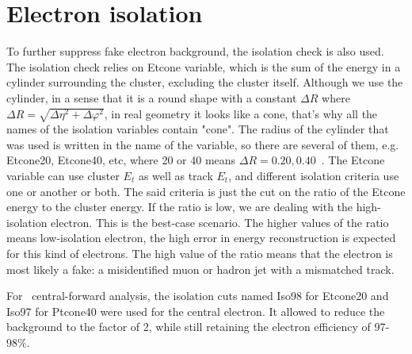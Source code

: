 \section{Electron isolation}
\label{sec:Rec_eleciso}

To further suppress fake electron background, the isolation check is also used. The isolation check relies on Etcone variable, which is the sum of the energy in a cylinder surrounding the cluster, excluding the cluster itself. Although we use the cylinder, in a sense that it is a round shape with a constant $\Delta R$ where $\Delta R = \sqrt{\Delta\eta^{2} + \Delta\varphi^{2}}$, in real geometry it looks like a cone, that's why all the names of the isolation variables contain "cone".  The radius of the cylinder that was used is written in the name of the variable, so there are several of them, e.g. Etcone20, Etcone40, etc, where 20 or 40 means $\Delta R = 0.20 , 0.40$~\cite{lib:reco_iso}. The Etcone variable can use cluster $E_{t}$ as well as track $E_{t}$, and different isolation criteria use one or another or both. The said criteria is just the cut on the ratio of the Etcone energy to the cluster energy. If the ratio is low, we are dealing with the high-isolation electron. This is the best-case scenario. The higher values of the ratio means low-isolation electron, the high error in energy reconstruction is expected for this kind of electrons. The high value of the ratio means that the electron is most likely a fake: a misidentified muon or hadron jet with a mismatched track.

\begin{figure}
\end{figure}

For \Zee\ central-forward analysis, the isolation cuts named Iso98 for Etcone20 and Iso97 for Ptcone40 were used for the central electron. It allowed to reduce the background to the factor of 2, while still retaining the electron efficiency of 97-98\%.
